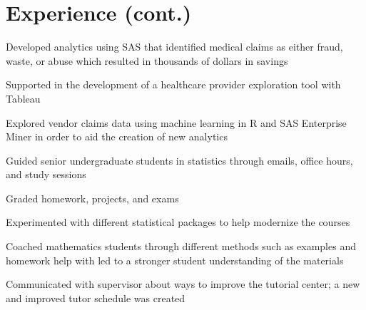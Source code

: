 \documentclass[]{plushcv}
\begin{document}
\begin{minipage}[t]{1.0\textwidth} 


\section{Experience (cont.)}

\vspace{\topsep} %
\begin{tightemize}
\sectionsep
\item Developed analytics using SAS that identified medical claims as either fraud, waste, or abuse which resulted in thousands of dollars in savings
\item Supported in the development of a healthcare provider exploration tool with Tableau
\item Explored vendor claims data using machine learning in R and SAS Enterprise Miner in order to aid the creation of new analytics 
\end{tightemize}
\sectionsep

\vspace{\topsep} %
\begin{tightemize}
\sectionsep
\item Guided senior undergraduate students in statistics through emails, office hours, and study sessions
\item Graded homework, projects, and exams
\item Experimented with different statistical packages to help modernize the courses 
\end{tightemize}
\sectionsep

\begin{tightemize}
\sectionsep
\item Coached mathematics students through different methods such as examples and homework help
with led to a stronger student understanding of the materials
\item Communicated with supervisor about ways to improve the tutorial center; a new and improved
tutor schedule was created
\end{tightemize}
\sectionsep


\end{minipage}
\end{document}
